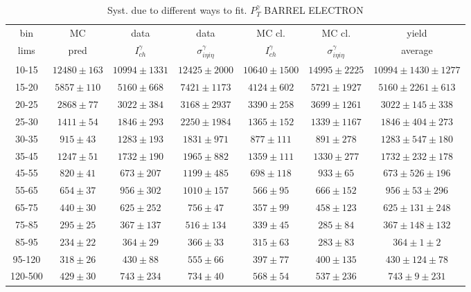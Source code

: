 \begin{table}[h]
  \tiny
  \begin{center}
  \caption{Syst. due to different ways to fit. $P_T^{\gamma}$ BARREL ELECTRON}
  \begin{tabular}{|c|c|c|c|c|c|c|}
    bin &  MC   & data  & data  & MC cl. & MC cl. & yield \\ 
    lims & pred & $I_{ch}^{\gamma}$ & $\sigma_{i\eta i\eta}^\gamma$  & $I_{ch}^{\gamma}$  & $\sigma_{i\eta i\eta}^\gamma$   & average \\ \hline
    10-15 & $12480\pm163$ & $10994\pm1331$ & $12425\pm2000$ & $10640\pm1500$ & $14995\pm2225$ &$10994\pm1430\pm1277$  \\ \hline
    15-20 & $5857\pm110$ & $5160\pm668$ & $7421\pm1173$ & $4124\pm602$ & $5721\pm1927$ &$5160\pm2261\pm613$  \\ \hline
    20-25 & $2868\pm77$ & $3022\pm384$ & $3168\pm2937$ & $3390\pm258$ & $3699\pm1261$ &$3022\pm145\pm338$  \\ \hline
    25-30 & $1411\pm54$ & $1846\pm293$ & $2250\pm1984$ & $1365\pm152$ & $1339\pm1167$ &$1846\pm404\pm273$  \\ \hline
    30-35 & $915\pm43$ & $1283\pm193$ & $1831\pm971$ & $877\pm111$ & $891\pm278$ &$1283\pm547\pm180$  \\ \hline
    35-45 & $1247\pm51$ & $1732\pm190$ & $1965\pm882$ & $1359\pm111$ & $1330\pm277$ &$1732\pm232\pm178$  \\ \hline
    45-55 & $820\pm41$ & $673\pm207$ & $1199\pm485$ & $698\pm118$ & $933\pm65$ &$673\pm526\pm196$  \\ \hline
    55-65 & $654\pm37$ & $956\pm302$ & $1010\pm157$ & $566\pm95$ & $666\pm152$ &$956\pm53\pm296$  \\ \hline
    65-75 & $440\pm30$ & $625\pm252$ & $756\pm47$ & $357\pm99$ & $458\pm123$ &$625\pm131\pm248$  \\ \hline
    75-85 & $295\pm25$ & $367\pm137$ & $516\pm134$ & $339\pm45$ & $285\pm84$ &$367\pm148\pm132$  \\ \hline
    85-95 & $234\pm22$ & $364\pm29$ & $366\pm33$ & $315\pm63$ & $283\pm83$ &$364\pm1\pm2$  \\ \hline
    95-120 & $318\pm26$ & $430\pm88$ & $555\pm66$ & $397\pm77$ & $400\pm135$ &$430\pm124\pm78$  \\ \hline
    120-500 & $429\pm30$ & $743\pm234$ & $734\pm40$ & $568\pm54$ & $537\pm236$ &$743\pm9\pm231$  \\ \hline
  \end{tabular}
  \label{tab:diff_ways_to_fit_phoEt_BARREL_electron}
  \end{center}
\end{table}

